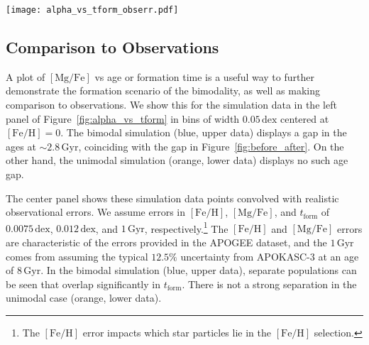 \documentclass[twocolumn,linenumbers,trackchanges]{aastex631}
\newcommand{\Gyr}{\ensuremath{\textrm{Gyr}}}
\newcommand{\FeH}{\ensuremath{[\textrm{Fe}/\textrm{H}]}}
\newcommand{\MgFe}{\ensuremath{[\textrm{Mg}/\textrm{Fe}]}}
\newcommand{\dex}{\ensuremath{\textrm{dex}}}
\begin{document}
\begin{figure*}
  \centering
  \texttt{[image: alpha\_vs\_tform\_obserr.pdf]}
  \caption{In the bimodal simulation, a gap appears when plotting stars in a $0.05\,\dex$ bin at $\FeH=0$ on the \MgFe{}-$t_{\textrm{form}}$ plane (blue, left panel). In the unimodal simulation there is no such gap (orange, left panel). In the middle panel, we show the same data but assuming errors in \FeH{}, \MgFe{}, and $t_{\textrm{form}}$ of $0.0075\,\dex$, $0.012\,\dex$, and $1\,\Gyr$, respectively. The gap in the bimodal simulation appears weakly as two populations overlapping in age. In the right panel we show stars in the Milky Way from APOKASC3 in $0.2\,\dex$ bins at $\FeH=-0.5$ (blue) and $0$ (orange). The low-metallicity bin is where the Milky Way bimodality is strongest while there is no bimodality at the solar-metallicity bin (see Figure~\ref{fig:fig1}). Offsets have been added to \MgFe{} values for clarity: $-0.3$ in the unimodal points in the left and middle panels, and $+0.1$ and $-0.1$ in the low/solar-metallicity bins, respectively, in the right panel.}
  \label{fig:alpha_vs_tform}
\end{figure*}

\subsection{Comparison to Observations}\label{ssec:compare_obs}
A plot of \MgFe{} vs age or formation time is a useful way to further demonstrate the formation scenario of the bimodality, as well as making comparison to observations. We show this for the simulation data in the left panel of Figure~\ref{fig:alpha_vs_tform} in bins of width $0.05\,\dex$ centered at $\FeH=0$. The bimodal simulation (blue, upper data) displays a gap in the ages at $\sim2.8\,\Gyr$, coinciding with the gap in Figure~\ref{fig:before_after}. On the other hand, the unimodal simulation (orange, lower data) displays no such age gap.

The center panel shows these simulation data points convolved with realistic observational errors. We assume errors in \FeH{}, \MgFe{}, and $t_{\textrm{form}}$ of $0.0075\,\dex$, $0.012\,\dex$, and $1\,\Gyr$, respectively.\footnote{The \FeH{} error impacts which star particles lie in the \FeH{} selection.} The \FeH{} and \MgFe{} errors are characteristic of the errors provided in the APOGEE dataset, and the $1\,\Gyr$ comes from assuming the typical $12.5\%$ uncertainty from APOKASC-3 at an age of $8\,\Gyr$. In the bimodal simulation (blue, upper data), separate populations can be seen that overlap significantly in $t_{\textrm{form}}$. There is not a strong separation in the unimodal case (orange, lower data).
\end{document}
